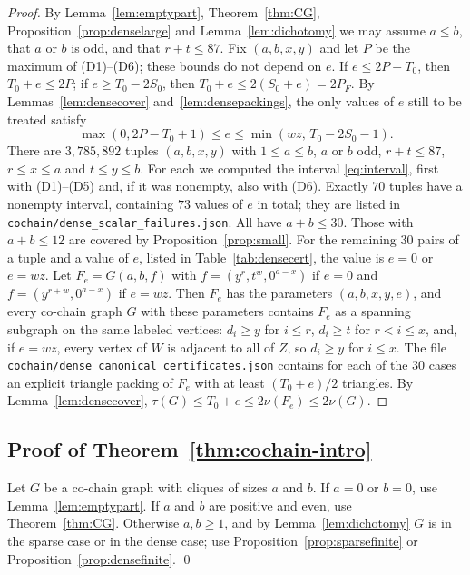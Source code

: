 \documentclass{amsart}
\theoremstyle{definition}
\theoremstyle{remark}
\numberwithin{equation}{section}
\numberwithin{table}{section}
\begin{document}
\begin{proof}
By Lemma~\ref{lem:emptypart}, Theorem~\ref{thm:CG}, Proposition~\ref{prop:denselarge} and Lemma~\ref{lem:dichotomy} we may assume $a\le b$, that $a$ or $b$ is odd, and that $r+t\le87$. Fix $(a,b,x,y)$ and let $P$ be the maximum of (D1)--(D6); these bounds do not depend on $e$. If $e\le2P-T_0$, then $T_0+e\le2P$; if $e\ge T_0-2S_0$, then $T_0+e\le2(S_0+e)=2P_F$. By Lemmas~\ref{lem:densecover} and~\ref{lem:densepackings}, the only values of $e$ still to be treated satisfy
\begin{equation}\label{eq:interval}
\max(0,2P-T_0+1)\le e\le\min(wz,\,T_0-2S_0-1).
\end{equation}
There are $3{,}785{,}892$ tuples $(a,b,x,y)$ with $1\le a\le b$, $a$ or $b$ odd, $r+t\le87$, $r\le x\le a$ and $t\le y\le b$. For each we computed the interval \eqref{eq:interval}, first with (D1)--(D5) and, if it was nonempty, also with (D6). Exactly $70$ tuples have a nonempty interval, containing $73$ values of $e$ in total; they are listed in \texttt{cochain/dense\_scalar\_failures.json}. All have $a+b\le30$. Those with $a+b\le12$ are covered by Proposition~\ref{prop:small}. For the remaining $30$ pairs of a tuple and a value of $e$, listed in Table~\ref{tab:densecert}, the value is $e=0$ or $e=wz$. Let $F_e=G(a,b,f)$ with $f=(y^r,t^w,0^{a-x})$ if $e=0$ and $f=(y^{r+w},0^{a-x})$ if $e=wz$. Then $F_e$ has the parameters $(a,b,x,y,e)$, and every co-chain graph $G$ with these parameters contains $F_e$ as a spanning subgraph on the same labeled vertices: $d_i\ge y$ for $i\le r$, $d_i\ge t$ for $r<i\le x$, and, if $e=wz$, every vertex of $W$ is adjacent to all of $Z$, so $d_i\ge y$ for $i\le x$. The file \texttt{cochain/dense\_canonical\_certificates.json} contains for each of the $30$ cases an explicit triangle packing of $F_e$ with at least $(T_0+e)/2$ triangles. By Lemma~\ref{lem:densecover}, $\tau(G)\le T_0+e\le2\nu(F_e)\le2\nu(G)$.
\end{proof}

\subsection{Proof of Theorem~\ref{thm:cochain-intro}}
Let $G$ be a co-chain graph with cliques of sizes $a$ and $b$. If $a=0$ or $b=0$, use Lemma~\ref{lem:emptypart}. If $a$ and $b$ are positive and even, use Theorem~\ref{thm:CG}. Otherwise $a,b\ge1$, and by Lemma~\ref{lem:dichotomy} $G$ is in the sparse case or in the dense case; use Proposition~\ref{prop:sparsefinite} or Proposition~\ref{prop:densefinite}. \qed
\end{document}
